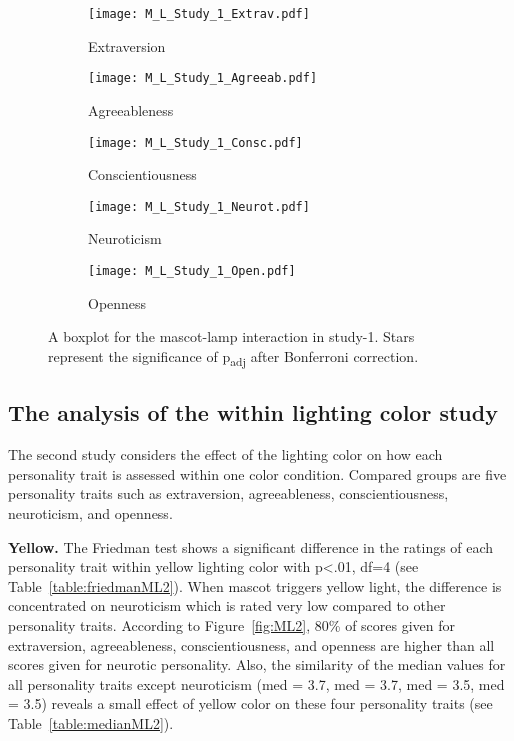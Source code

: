 \begin{figure}[hbt!]
    \centering
    \begin{subfigure}{.40\textwidth}
        \centering
        \texttt{[image: M\_L\_Study\_1\_Extrav.pdf]}
        \caption{Extraversion}
        \label{fig:sub1}
    \end{subfigure}\hfill%
    \begin{subfigure}{.40\textwidth}
        \centering
        \texttt{[image: M\_L\_Study\_1\_Agreeab.pdf]}
        \caption{Agreeableness}
        \label{fig:sub2}
    \end{subfigure}\hfill
    \begin{subfigure}{.40\textwidth}
        \centering
        \texttt{[image: M\_L\_Study\_1\_Consc.pdf]}
        \caption{Conscientiousness}
        \label{fig:sub1}
    \end{subfigure}\hfill%
    \begin{subfigure}{.40\textwidth}
        \centering
        \texttt{[image: M\_L\_Study\_1\_Neurot.pdf]}
        \caption{Neuroticism}
        \label{fig:sub1}
    \end{subfigure}\hfill%
    \begin{subfigure}{.40\textwidth}
        \centering
        \texttt{[image: M\_L\_Study\_1\_Open.pdf]}
        \caption{Openness}
        \label{fig:sub1}
    \end{subfigure}\hfill%
    \caption{A boxplot for the mascot-lamp interaction in study-1.
    Stars represent the significance of p\textsubscript{adj} after Bonferroni correction.}
    \label{fig:ML1}
\end{figure}
\subsection{The analysis of the within lighting color study}
\label{subsec:MLstudy2}
The second study considers the effect of the lighting color on how each
personality trait is assessed within one color condition.
Compared groups are five personality traits such as extraversion, agreeableness, conscientiousness,
neuroticism, and openness.

\par\textbf{Yellow.}
The Friedman test shows a significant difference in the ratings of each personality trait
within yellow lighting color with p<.01, df=4 (see Table~\ref{table:friedmanML2}).
When mascot triggers yellow light, the difference is concentrated on neuroticism
which is rated very low compared to other personality traits.
According to Figure~\ref{fig:ML2}, 80\% of scores given for extraversion, agreeableness,
conscientiousness, and openness are higher than all scores given for neurotic personality.
Also, the similarity of the median values for all personality traits except
neuroticism (med = 3.7, med = 3.7, med = 3.5, med = 3.5) reveals a small effect of yellow
color on these four personality traits (see Table~\ref{table:medianML2}).

